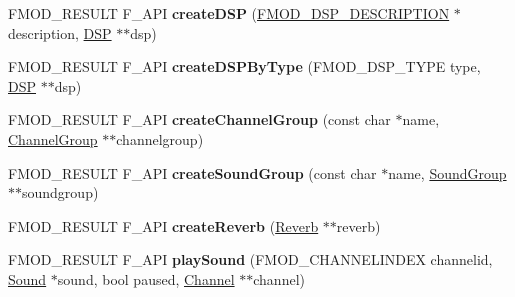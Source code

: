 \begin{DoxyCompactItemize}
\item 
\hypertarget{class_f_m_o_d_1_1_system_a9e14998873b05d52108096d92b7994bd}{F\-M\-O\-D\-\_\-\-R\-E\-S\-U\-L\-T F\-\_\-\-A\-P\-I {\bfseries create\-D\-S\-P} (\hyperlink{struct_f_m_o_d___d_s_p___d_e_s_c_r_i_p_t_i_o_n}{F\-M\-O\-D\-\_\-\-D\-S\-P\-\_\-\-D\-E\-S\-C\-R\-I\-P\-T\-I\-O\-N} $\ast$description, \hyperlink{class_f_m_o_d_1_1_d_s_p}{D\-S\-P} $\ast$$\ast$dsp)}\label{class_f_m_o_d_1_1_system_a9e14998873b05d52108096d92b7994bd}

\item 
\hypertarget{class_f_m_o_d_1_1_system_ab3a4c98eb70da7e96866b0f40f5cbd22}{F\-M\-O\-D\-\_\-\-R\-E\-S\-U\-L\-T F\-\_\-\-A\-P\-I {\bfseries create\-D\-S\-P\-By\-Type} (F\-M\-O\-D\-\_\-\-D\-S\-P\-\_\-\-T\-Y\-P\-E type, \hyperlink{class_f_m_o_d_1_1_d_s_p}{D\-S\-P} $\ast$$\ast$dsp)}\label{class_f_m_o_d_1_1_system_ab3a4c98eb70da7e96866b0f40f5cbd22}

\item 
\hypertarget{class_f_m_o_d_1_1_system_af4d7063579a60c8986eb8bb1f67e7f2c}{F\-M\-O\-D\-\_\-\-R\-E\-S\-U\-L\-T F\-\_\-\-A\-P\-I {\bfseries create\-Channel\-Group} (const char $\ast$name, \hyperlink{class_f_m_o_d_1_1_channel_group}{Channel\-Group} $\ast$$\ast$channelgroup)}\label{class_f_m_o_d_1_1_system_af4d7063579a60c8986eb8bb1f67e7f2c}

\item 
\hypertarget{class_f_m_o_d_1_1_system_adac6229aff0ac7480c50988d753df46f}{F\-M\-O\-D\-\_\-\-R\-E\-S\-U\-L\-T F\-\_\-\-A\-P\-I {\bfseries create\-Sound\-Group} (const char $\ast$name, \hyperlink{class_f_m_o_d_1_1_sound_group}{Sound\-Group} $\ast$$\ast$soundgroup)}\label{class_f_m_o_d_1_1_system_adac6229aff0ac7480c50988d753df46f}

\item 
\hypertarget{class_f_m_o_d_1_1_system_a4739df49d53fb59dce376f305fa33d9a}{F\-M\-O\-D\-\_\-\-R\-E\-S\-U\-L\-T F\-\_\-\-A\-P\-I {\bfseries create\-Reverb} (\hyperlink{class_f_m_o_d_1_1_reverb}{Reverb} $\ast$$\ast$reverb)}\label{class_f_m_o_d_1_1_system_a4739df49d53fb59dce376f305fa33d9a}

\item 
\hypertarget{class_f_m_o_d_1_1_system_a9757b01ce190269ccec4cf0a11119277}{F\-M\-O\-D\-\_\-\-R\-E\-S\-U\-L\-T F\-\_\-\-A\-P\-I {\bfseries play\-Sound} (F\-M\-O\-D\-\_\-\-C\-H\-A\-N\-N\-E\-L\-I\-N\-D\-E\-X channelid, \hyperlink{class_f_m_o_d_1_1_sound}{Sound} $\ast$sound, bool paused, \hyperlink{class_f_m_o_d_1_1_channel}{Channel} $\ast$$\ast$channel)}\label{class_f_m_o_d_1_1_system_a9757b01ce190269ccec4cf0a11119277}


\end{DoxyCompactItemize}
